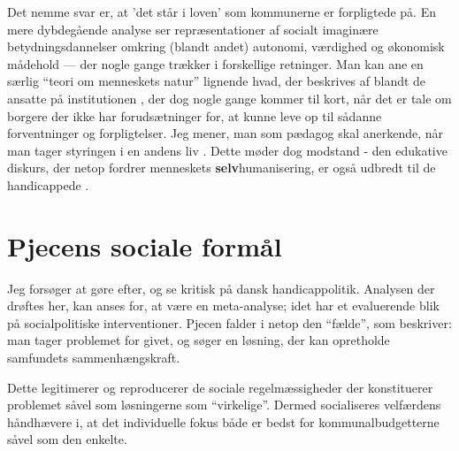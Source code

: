 Det nemme svar er, at 'det står i loven' som kommunerne er forpligtede på.
En mere dybdegående analyse ser repræsentationer af socialt imaginære betydningsdannelser  \autocite[s. 91]{moutsiosSocialeInstitutionerOg2016} omkring (blandt andet) autonomi, værdighed og økonomisk mådehold --- der nogle gange trækker i forskellige retninger.
Man kan ane en særlig “teori om menneskets natur” lignende hvad, der beskrives af \citeauthor{goffmanAsylumsEssaysSocial1991} blandt de ansatte på institutionen \autocite[ss. 84-85]{goffmanAsylumsEssaysSocial1991}, der dog nogle gange kommer til kort, når det er tale om borgere der ikke har forudsætninger for, at kunne leve op til sådanne forventninger og forpligtelser.
Jeg mener, man som pædagog skal anerkende, når man tager styringen i en andens liv \autocite{andersenSocialWorkPower2018}.
Dette møder dog modstand - den edukative diskurs, der netop fordrer menneskets \textbf{selv}humanisering, er også udbredt til de handicappede \autocite[s. 77]{lieberkindUddannelsessamfundetOgEdukative2016}.

\section{Pjecens sociale formål}
Jeg forsøger at gøre \citeauthor{scheurichPolicyArchaeologyNew1994} efter, og se kritisk på dansk handicappolitik.
Analysen der drøftes her, kan anses for, at være en meta-analyse; idet  har et evaluerende blik på socialpolitiske interventioner.
Pjecen falder i netop den “fælde”, som \citeauthor{scheurichPolicyArchaeologyNew1994} beskriver: man tager problemet for givet, og søger en løsning, der kan opretholde samfundets sammenhængskraft.

Dette legitimerer og reproducerer de sociale regelmæssigheder der konstituerer problemet såvel som løsningerne som “virkelige”. Dermed socialiseres velfærdens håndhævere i, at det individuelle fokus både er bedst for kommunalbudgetterne såvel som den enkelte.
